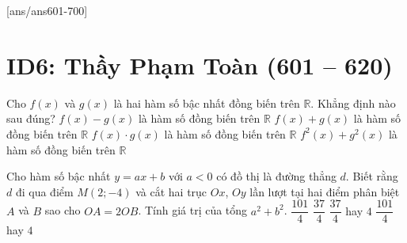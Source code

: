 [ans/ans601-700]
\setcounter{ex}{600}
\section*{ID6: Thầy Phạm Toàn (601 -- 620)}
\begin{ex}%
	Cho $f(x)$ và $g(x)$ là hai hàm số bậc nhất đồng biến trên $\mathbb{R}$. Khẳng định nào sau đúng?
	\choice
	{$f(x)-g(x)$ là hàm số đồng biến trên $\mathbb{R}$}
	{\True $f(x)+g(x)$ là hàm số đồng biến trên $\mathbb{R}$}
	{$f(x)\cdot g(x)$ là hàm số đồng biến trên $\mathbb{R}$}
	{$f^2(x)+g^2(x)$ là hàm số đồng biến trên $\mathbb{R}$}
\end{ex}

\begin{ex}%
Cho hàm số bậc nhất $y=ax+b$ với $a<0$ có đồ thị là đường thẳng $d$. Biết rằng $d$ đi qua điểm $M(2;-4)$ và cắt hai trục $Ox$, $Oy$ lần lượt tại hai điểm phân biệt $A$ và $B$ sao cho $OA=2OB$. Tính giá trị của tổng $a^2+b^2$.
\choice
{$\dfrac{101}{4}$}
{\True $\dfrac{37}{4}$}
{$\dfrac{37}{4}$ hay $4$}
{$\dfrac{101}{4}$ hay $4$}
\end{ex}

